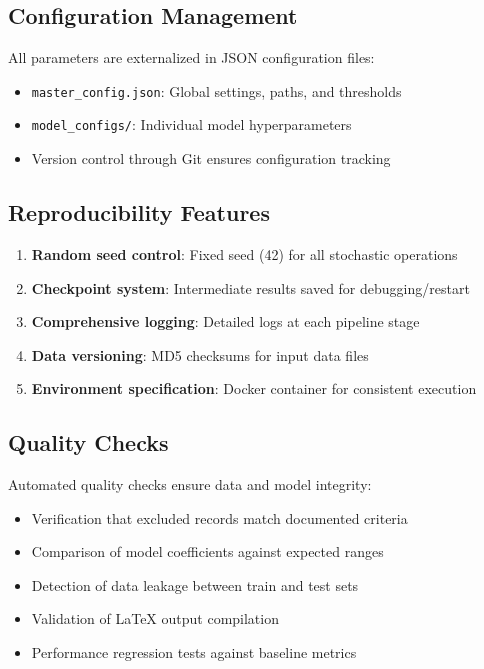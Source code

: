 \subsection{Configuration Management}

All parameters are externalized in JSON configuration files:
\begin{itemize}
    \item \texttt{master\_config.json}: Global settings, paths, and thresholds
    \item \texttt{model\_configs/}: Individual model hyperparameters
    \item Version control through Git ensures configuration tracking
\end{itemize}

\subsection{Reproducibility Features}

\begin{enumerate}
    \item \textbf{Random seed control}: Fixed seed (42) for all stochastic operations
    \item \textbf{Checkpoint system}: Intermediate results saved for debugging/restart
    \item \textbf{Comprehensive logging}: Detailed logs at each pipeline stage
    \item \textbf{Data versioning}: MD5 checksums for input data files
    \item \textbf{Environment specification}: Docker container for consistent execution
\end{enumerate}

\subsection{Quality Checks}

Automated quality checks ensure data and model integrity:
\begin{itemize}
    \item Verification that excluded records match documented criteria
    \item Comparison of model coefficients against expected ranges
    \item Detection of data leakage between train and test sets
    \item Validation of LaTeX output compilation
    \item Performance regression tests against baseline metrics
\end{itemize}

